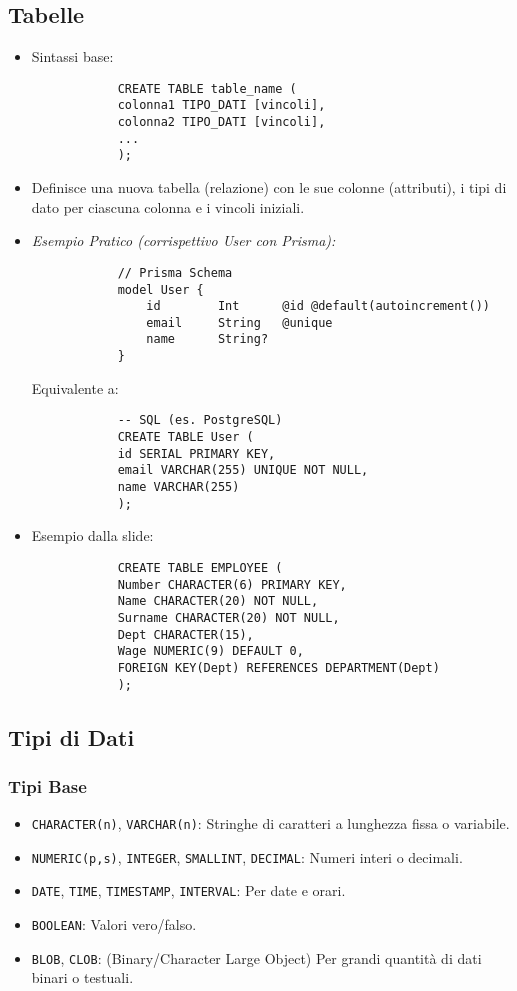 \documentclass{article}
\begin{document}
	\subsection{Tabelle}
	\begin{itemize}
		\item Sintassi base:
		\begin{verbatim}
			CREATE TABLE table_name (
			colonna1 TIPO_DATI [vincoli],
			colonna2 TIPO_DATI [vincoli],
			...
			);
		\end{verbatim}
		\item Definisce una nuova tabella (relazione) con le sue colonne (attributi), i tipi di dato per ciascuna colonna e i vincoli iniziali.
		\item \textit{Esempio Pratico (corrispettivo User con Prisma):}
		\begin{verbatim}
			// Prisma Schema
			model User {
				id        Int      @id @default(autoincrement())
				email     String   @unique
				name      String?
			}
		\end{verbatim}
		Equivalente a:
		\begin{verbatim}
			-- SQL (es. PostgreSQL)
			CREATE TABLE User (
			id SERIAL PRIMARY KEY,
			email VARCHAR(255) UNIQUE NOT NULL,
			name VARCHAR(255)
			);
		\end{verbatim}
		\item Esempio dalla slide:
		\begin{verbatim}
			CREATE TABLE EMPLOYEE (
			Number CHARACTER(6) PRIMARY KEY,
			Name CHARACTER(20) NOT NULL,
			Surname CHARACTER(20) NOT NULL,
			Dept CHARACTER(15),
			Wage NUMERIC(9) DEFAULT 0,
			FOREIGN KEY(Dept) REFERENCES DEPARTMENT(Dept)
			);
		\end{verbatim}
	\end{itemize}
	
	\subsection{Tipi di Dati}
	\subsubsection{Tipi Base}
	\begin{itemize}
		\item \texttt{CHARACTER(n)}, \texttt{VARCHAR(n)}: Stringhe di caratteri a lunghezza fissa o variabile.
		\item \texttt{NUMERIC(p,s)}, \texttt{INTEGER}, \texttt{SMALLINT}, \texttt{DECIMAL}: Numeri interi o decimali.
		\item \texttt{DATE}, \texttt{TIME}, \texttt{TIMESTAMP}, \texttt{INTERVAL}: Per date e orari.
		\item \texttt{BOOLEAN}: Valori vero/falso.
		\item \texttt{BLOB}, \texttt{CLOB}: (Binary/Character Large Object) Per grandi quantità di dati binari o testuali.
	\end{itemize}
\end{document}
